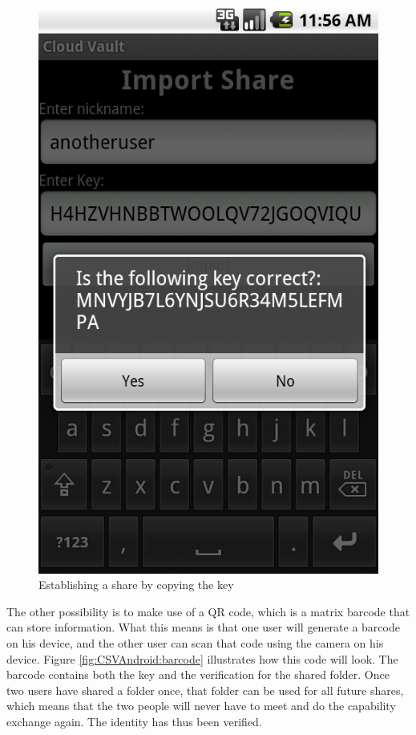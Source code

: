 \documentclass[pdftex,english,10pt,b5paper,twoside]{book}
\begin{document}
\begin{figure}[h!]
    \centering
    \includegraphics[scale=0.4]{client-manualimport.png}
    \caption{Establishing a share by copying the key}
    \label{fig:CSVAndroid:manualimport}
\end{figure}

The other possibility is to make use of a \ac{QR} code, which is a matrix
barcode that can store information. What this means is that one user will
generate a barcode on his device, and the other user can scan that code using
the camera on his device. Figure \ref{fig:CSVAndroid:barcode} illustrates how
this code will look. The barcode contains both the key and the verification for
the shared folder. Once two users have shared a folder once, that folder can be
used for all future shares, which means that the two people will never have to
meet and do the capability exchange again. The identity has thus been verified.
\end{document}

